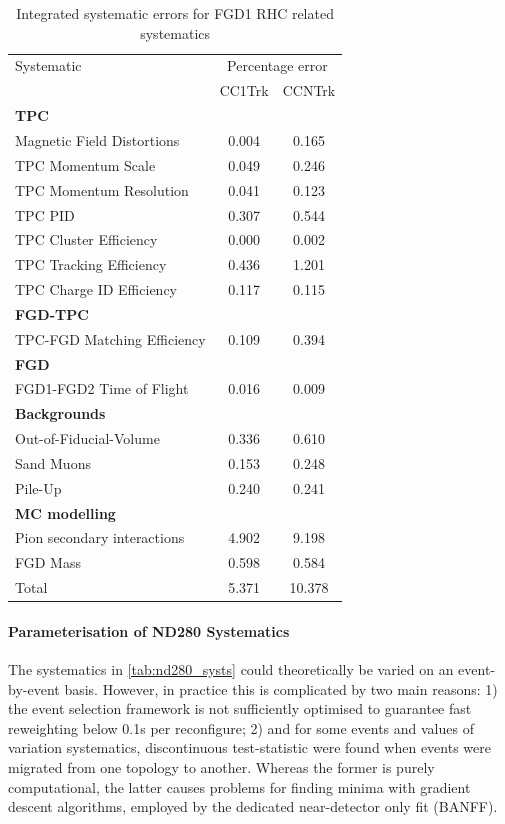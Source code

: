 \begin{table}[h]
	\begin{tabular}{l | c c}
		\hline
		\hline
		Systematic & \multicolumn{2}{c}{Percentage error} \\
				   & CC1Trk & CCNTrk \\ 
		\hline	
		\multicolumn{3}{l}{\textbf{TPC}} \\
		Magnetic Field Distortions		& 0.004 & 0.165 \\
		TPC Momentum Scale				& 0.049 & 0.246 \\
		TPC Momentum Resolution			& 0.041 & 0.123 \\
		TPC PID							& 0.307 & 0.544 \\
		TPC Cluster Efficiency			& 0.000 & 0.002 \\
		TPC Tracking Efficiency			& 0.436 & 1.201 \\
		TPC Charge ID Efficiency		& 0.117 & 0.115 \\
		\hline 
		\multicolumn{3}{l}{\textbf{FGD-TPC}} \\
		TPC-FGD Matching Efficiency		& 0.109 & 0.394 \\
		\hline
		\multicolumn{3}{l}{\textbf{FGD}} \\
		FGD1-FGD2 Time of Flight		& 0.016 & 0.009 \\
		\hline
		\multicolumn{3}{l}{\textbf{Backgrounds}} \\
		Out-of-Fiducial-Volume			& 0.336 & 0.610 \\
		Sand Muons						& 0.153 & 0.248 \\
		Pile-Up							& 0.240 & 0.241 \\
		\hline
		\multicolumn{3}{l}{\textbf{MC modelling}} \\
		Pion secondary interactions		& 4.902 & 9.198 \\
		FGD Mass						& 0.598 & 0.584 \\
		\hline
		Total 							& 5.371 & 10.378 \\
		\hline
		\hline
	\end{tabular}
	\caption{Integrated systematic errors for FGD1 RHC related systematics}
	\label{tab:nd280_syst_error_nubar}
\end{table}

\paragraph{Parameterisation of ND280 Systematics}
The systematics in \autoref{tab:nd280_systs} could theoretically be varied on an event-by-event basis. However, in practice this is complicated by two main reasons: 1) the event selection framework is not sufficiently optimised to guarantee fast reweighting below 0.1s per reconfigure; 2) and for some events and values of variation systematics, discontinuous test-statistic were found when events were migrated from one topology to another. Whereas the former is purely computational, the latter causes problems for finding minima with gradient descent algorithms, employed by the dedicated near-detector only fit (BANFF). 

